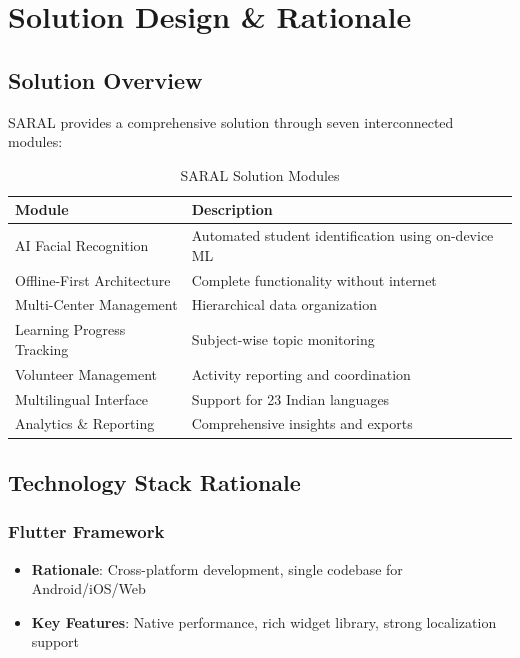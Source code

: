 \documentclass[12pt,a4paper]{article}
\begin{document}
\newpage

\section{Solution Design \& Rationale}

\subsection{Solution Overview}
SARAL provides a comprehensive solution through seven interconnected modules:

\begin{table}[H]
\centering
\small
\begin{tabularx}{\textwidth}{|l|X|}
\hline
\rowcolor{lightgray}
\textbf{Module} & \textbf{Description} \\
\hline
AI Facial Recognition & Automated student identification using on-device ML \\
\hline
Offline-First Architecture & Complete functionality without internet \\
\hline
Multi-Center Management & Hierarchical data organization \\
\hline
Learning Progress Tracking & Subject-wise topic monitoring \\
\hline
Volunteer Management & Activity reporting and coordination \\
\hline
Multilingual Interface & Support for 23 Indian languages \\
\hline
Analytics \& Reporting & Comprehensive insights and exports \\
\hline
\end{tabularx}
\caption{SARAL Solution Modules}
\end{table}

\subsection{Technology Stack Rationale}

\subsubsection{Flutter Framework}
\begin{itemize}[leftmargin=*, itemsep=0.2em]
    \item \textbf{Rationale}: Cross-platform development, single codebase for Android/iOS/Web
    \item \textbf{Key Features}: Native performance, rich widget library, strong localization support
\end{itemize}
\end{document}
